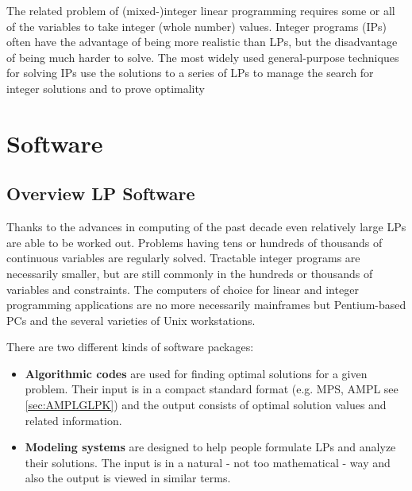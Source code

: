The related problem of (mixed-)integer linear programming requires some or all of the variables to take integer (whole number) values. Integer programs (IPs) often have the advantage of being more realistic than LPs, but the disadvantage of being much harder to solve.
The most widely used general-purpose techniques for solving IPs use the solutions to a series of LPs to manage the search for integer solutions and to prove optimality

\section{Software}
\label{sec:Software}

\subsection{Overview LP Software}
\label{sec:OverviewLPSoftware}

Thanks to the advances in computing of the past decade even relatively large LPs are able to be worked out.
Problems having tens or hundreds of thousands of continuous variables are regularly solved. Tractable integer programs are necessarily smaller, but are still commonly in the hundreds or thousands of variables and constraints. 
The computers of choice for linear and integer programming applications are no more necessarily mainframes but Pentium-based PCs and the several varieties of Unix workstations.

There are two different kinds of software packages:

\begin{itemize}
	\item \textbf{Algorithmic codes} are used for finding optimal solutions for a given problem. Their input is in a compact standard format (e.g. MPS, AMPL see \ref{sec:AMPLGLPK}) and the output consists of optimal solution values and related information.
	\item \textbf{Modeling systems} are designed to help people formulate LPs and analyze their solutions. The input is in a natural - not too mathematical - way and also the output is viewed in similar terms.
\end{itemize}

